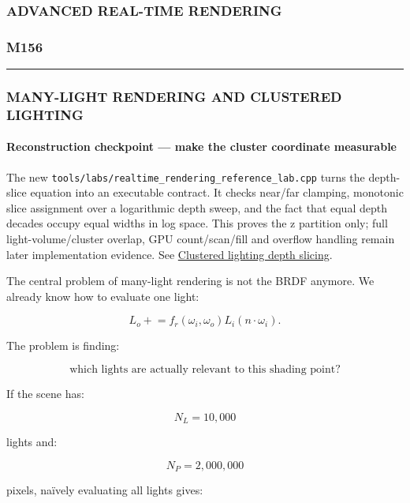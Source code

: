 \subsubsection{ADVANCED REAL-TIME RENDERING}\label{advanced-real-time-rendering}

\subsubsection{M156}\label{m156}

\begin{center}\rule{0.5\linewidth}{0.5pt}\end{center}

\subsubsection{MANY-LIGHT RENDERING AND CLUSTERED LIGHTING}\label{many-light-rendering-and-clustered-lighting}

\paragraph{Reconstruction checkpoint --- make the cluster coordinate measurable}\label{reconstruction-checkpoint-make-the-cluster-coordinate-measurable}

The new \texttt{tools/labs/realtime\_rendering\_reference\_lab.cpp} turns the depth-slice equation into an executable contract. It checks near/far clamping, monotonic slice assignment over a logarithmic depth sweep, and the fact that equal depth decades occupy equal widths in log space. This proves the z partition only; full light-volume/cluster overlap, GPU count/scan/fill and overflow handling remain later implementation evidence. See \hyperref[appendix-b0efeb3f3648]{Clustered lighting depth slicing}.

The central problem of many-light rendering is not the BRDF anymore. We already know how to evaluate one light:

\[
L_o \mathrel{+}=
f_r(\omega_i,\omega_o)
L_i
(n\cdot\omega_i).
\]

The problem is finding:

\[
\boxed{
\text{which lights are actually relevant to this shading point?}
}
\]

If the scene has:

\[
N_L=10,000
\]

lights and:

\[
N_P=2,000,000
\]

pixels, naïvely evaluating all lights gives:

